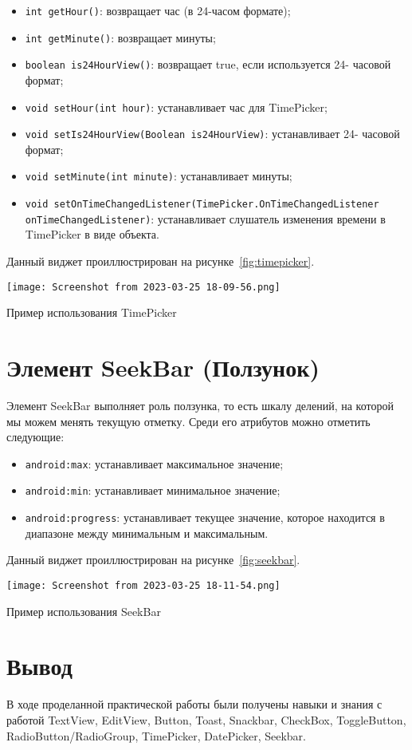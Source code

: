 \begin{itemize}
	\item \texttt{int getHour()}: возвращает час (в 24-часом формате);
	\item \texttt{int getMinute()}: возвращает минуты;
	\item \texttt{boolean is24HourView()}: возвращает true, если
		используется 24- часовой формат;
	\item \texttt{void setHour(int hour)}: устанавливает час для TimePicker;
	\item \texttt{void setIs24HourView(Boolean is24HourView)}:
		устанавливает 24- часовой формат;
	\item \texttt{void setMinute(int minute)}: устанавливает минуты;
	\item \texttt{void setOnTimeChangedListener(TimePicker.OnTimeChangedListener 
		onTimeChangedListener)}: устанавливает слушатель изменения времени 
		в TimePicker в виде объекта.
\end{itemize}

Данный виджет проиллюстрирован на рисунке~\ref{fig:timepicker}.

\begin{image}
	\texttt{[image: Screenshot from 2023-03-25 18-09-56.png]}
	\caption{Пример использования TimePicker}
	\label{fig:timepicker}
\end{image}

\section{Элемент SeekBar (Ползунок)}
Элемент SeekBar выполняет роль ползунка, то есть шкалу делений, на 
которой мы можем менять текущую отметку. Среди его атрибутов можно 
отметить следующие:

\begin{itemize}
	\item \texttt{android:max}: устанавливает максимальное значение;
	\item \texttt{android:min}: устанавливает минимальное значение;
	\item \texttt{android:progress}: устанавливает текущее значение,
		которое находится в диапазоне между минимальным и максимальным.
\end{itemize}

Данный виджет проиллюстрирован на рисунке~\ref{fig:seekbar}.

\begin{image}
	\texttt{[image: Screenshot from 2023-03-25 18-11-54.png]}
	\caption{Пример использования SeekBar}
	\label{fig:seekbar}
\end{image}


\clearpage

\section*{\LARGE{Вывод}}
В ходе проделанной практической работы были получены навыки и 
знания с работой TextView, EditView, Button, Toast, Snackbar, CheckBox, 
ToggleButton, RadioButton/RadioGroup, TimePicker, DatePicker, Seekbar.

